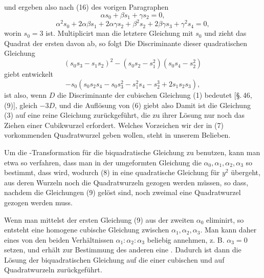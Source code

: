 
und ergeben also nach (16) des vorigen Paragraphen
\[
\alpha s_0 + \beta s_1 + \gamma s_2 = 0,
\]
\[
\alpha^2 s_0 + 2\alpha\beta s_1 + 2\alpha\gamma s_2 + \beta^2 s_2 + 2\beta\gamma s_3 + \gamma^2 s_4 = 0,
\]
worin $s_0 = 3$ ist. Multiplicirt man die letztere Gleichung mit $s_0$ und zieht das Quadrat der ersten davon ab, so folgt
Die Discriminante dieser quadratischen Gleichung
\[
(s_0 s_3 - s_1 s_2)^2 - (s_0 s_2 - s_1^2)(s_0 s_4 - s_2^2)
\]
giebt entwickelt
\[
-s_0(s_0 s_2 s_4 - s_0 s_3^2 - s_1^2 s_4 - s_2^3 + 2 s_1 s_2 s_3),
\]
ist also, wenn $D$ die Discriminante der cubischen Gleichung (1) bedeutet [\S.\,46, (9)], gleich $-3D$, und die Auflösung von (6) giebt also
Damit ist die Gleichung (3) auf eine reine Gleichung zurückgeführt, die zu ihrer Lösung nur noch das Ziehen einer Cubikwurzel erfordert. Welches Vorzeichen wir der in (7) vorkommenden Quadratwurzel geben wollen, steht in unserem Belieben.

Um die -Transformation für die biquadratische Gleichung zu benutzen, kann man etwa so verfahren, dass man in der umgeformten Gleichung
die $\alpha_0, \alpha_1, \alpha_2, \alpha_3$ so bestimmt, dass
wird, wodurch (8) in eine quadratische Gleichung für $y^2$ übergeht, aus deren Wurzeln noch die Quadratwurzeln gezogen werden müssen, so dass, nachdem die Gleichungen (9) gelöst sind, noch zweimal eine Quadratwurzel gezogen werden muss.

Wenn man mittelst der ersten Gleichung (9) aus der zweiten $\alpha_0$ eliminirt, so entsteht eine homogene cubische Gleichung zwischen $\alpha_1, \alpha_2, \alpha_3$. Man kann daher eines von den beiden Verhältnissen $\alpha_1:\alpha_2:\alpha_3$ beliebig annehmen, z. B. $\alpha_3 = 0$ setzen, und erhält zur Bestimmung des anderen eine . Dadurch ist dann die Lösung der biquadratischen Gleichung auf die einer cubischen und auf Quadratwurzeln zurückgeführt.
